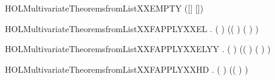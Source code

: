 \newcommand{\HOLMultivariateTheoremsFDOMXXfromList}{\UseVerbatim{HOLMultivariateTheoremsFDOMXXfromList}}
\begin{SaveVerbatim}{HOLMultivariateTheoremsfromListXXEMPTY}
\HOLTokenTurnstile{} ([] \HOLSymConst{\HOLTokenMapto{}} []) \HOLSymConst{=} 
\end{SaveVerbatim}
\newcommand{\HOLMultivariateTheoremsfromListXXEMPTY}{\UseVerbatim{HOLMultivariateTheoremsfromListXXEMPTY}}
\begin{SaveVerbatim}{HOLMultivariateTheoremsfromListXXFAPPLYXXEL}
\HOLTokenTurnstile{} \HOLSymConst{\HOLTokenForall{}}  .
         \HOLSymConst{\HOLTokenConj{}} (  \HOLSymConst{=}  ) \HOLSymConst{\HOLTokenConj{}}  \HOLSymConst{\HOLTokenLt{}}   \HOLSymConst{\HOLTokenImp{}}
       (( \HOLSymConst{\HOLTokenMapto{}} )  (  ) \HOLSymConst{=}   )
\end{SaveVerbatim}
\newcommand{\HOLMultivariateTheoremsfromListXXFAPPLYXXEL}{\UseVerbatim{HOLMultivariateTheoremsfromListXXFAPPLYXXEL}}
\begin{SaveVerbatim}{HOLMultivariateTheoremsfromListXXFAPPLYXXELYY}
\HOLTokenTurnstile{} \HOLSymConst{\HOLTokenForall{}}    .
       \HOLSymConst{\HOLTokenNeg{}}   \HOLSymConst{\HOLTokenConj{}}   \HOLSymConst{\HOLTokenConj{}} (  \HOLSymConst{=}  ) \HOLSymConst{\HOLTokenConj{}}
        \HOLSymConst{\HOLTokenLt{}}   \HOLSymConst{\HOLTokenImp{}}
       ((\HOLSymConst{::} \HOLSymConst{\HOLTokenMapto{}} \HOLSymConst{::})  (  ) \HOLSymConst{=}   )
\end{SaveVerbatim}
\newcommand{\HOLMultivariateTheoremsfromListXXFAPPLYXXELYY}{\UseVerbatim{HOLMultivariateTheoremsfromListXXFAPPLYXXELYY}}
\begin{SaveVerbatim}{HOLMultivariateTheoremsfromListXXFAPPLYXXHD}
\HOLTokenTurnstile{} \HOLSymConst{\HOLTokenForall{}}    .
       \HOLSymConst{\HOLTokenNeg{}}   \HOLSymConst{\HOLTokenConj{}}   \HOLSymConst{\HOLTokenConj{}} (  \HOLSymConst{=}  ) \HOLSymConst{\HOLTokenImp{}}
       ((\HOLSymConst{::} \HOLSymConst{\HOLTokenMapto{}} \HOLSymConst{::})   \HOLSymConst{=} )
\end{SaveVerbatim}
